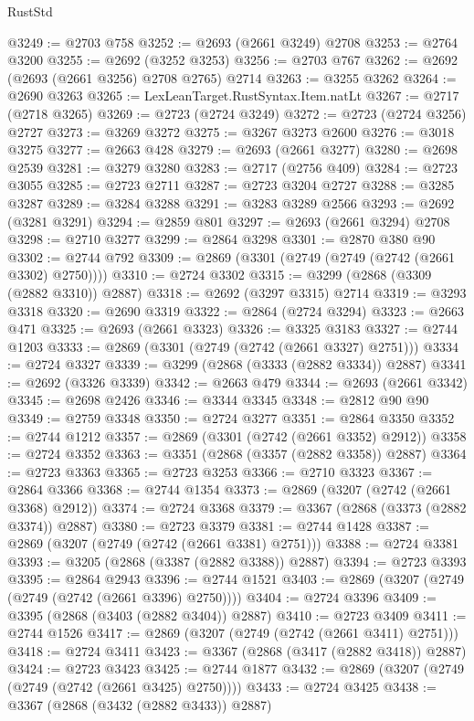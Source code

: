 \begin{lexlean}{RustStd}
\begin{coremodule}
@3249 := @2703 @758
@3252 := @2693 (@2661 @3249) @2708
@3253 := @2764 @3200
@3255 := @2692 (@3252 @3253)
@3256 := @2703 @767
@3262 := @2692 (@2693 (@2661 @3256) @2708 @2765) @2714
@3263 := @3255 @3262
@3264 := @2690 @3263
@3265 := LexLeanTarget.RustSyntax.Item.natLt
@3267 := @2717 (@2718 @3265)
@3269 := @2723 (@2724 @3249)
@3272 := @2723 (@2724 @3256) @2727
@3273 := @3269 @3272
@3275 := @3267 @3273 @2600
@3276 := @3018 @3275
@3277 := @2663 @428
@3279 := @2693 (@2661 @3277)
@3280 := @2698 @2539
@3281 := @3279 @3280
@3283 := @2717 (@2756 @409)
@3284 := @2723 @3055
@3285 := @2723 @2711
@3287 := @2723 @3204 @2727
@3288 := @3285 @3287
@3289 := @3284 @3288
@3291 := @3283 @3289 @2566
@3293 := @2692 (@3281 @3291)
@3294 := @2859 @801
@3297 := @2693 (@2661 @3294) @2708
@3298 := @2710 @3277
@3299 := @2864 @3298
@3301 := @2870 @380 @90
@3302 := @2744 @792
@3309 := @2869 (@3301 (@2749 (@2749 (@2742 (@2661 @3302) @2750))))
@3310 := @2724 @3302
@3315 := @3299 (@2868 (@3309 (@2882 @3310)) @2887)
@3318 := @2692 (@3297 @3315) @2714
@3319 := @3293 @3318
@3320 := @2690 @3319
@3322 := @2864 (@2724 @3294)
@3323 := @2663 @471
@3325 := @2693 (@2661 @3323)
@3326 := @3325 @3183
@3327 := @2744 @1203
@3333 := @2869 (@3301 (@2749 (@2742 (@2661 @3327) @2751)))
@3334 := @2724 @3327
@3339 := @3299 (@2868 (@3333 (@2882 @3334)) @2887)
@3341 := @2692 (@3326 @3339)
@3342 := @2663 @479
@3344 := @2693 (@2661 @3342)
@3345 := @2698 @2426
@3346 := @3344 @3345
@3348 := @2812 @90 @90
@3349 := @2759 @3348
@3350 := @2724 @3277
@3351 := @2864 @3350
@3352 := @2744 @1212
@3357 := @2869 (@3301 (@2742 (@2661 @3352) @2912))
@3358 := @2724 @3352
@3363 := @3351 (@2868 (@3357 (@2882 @3358)) @2887)
@3364 := @2723 @3363
@3365 := @2723 @3253
@3366 := @2710 @3323
@3367 := @2864 @3366
@3368 := @2744 @1354
@3373 := @2869 (@3207 (@2742 (@2661 @3368) @2912))
@3374 := @2724 @3368
@3379 := @3367 (@2868 (@3373 (@2882 @3374)) @2887)
@3380 := @2723 @3379
@3381 := @2744 @1428
@3387 := @2869 (@3207 (@2749 (@2742 (@2661 @3381) @2751)))
@3388 := @2724 @3381
@3393 := @3205 (@2868 (@3387 (@2882 @3388)) @2887)
@3394 := @2723 @3393
@3395 := @2864 @2943
@3396 := @2744 @1521
@3403 := @2869 (@3207 (@2749 (@2749 (@2742 (@2661 @3396) @2750))))
@3404 := @2724 @3396
@3409 := @3395 (@2868 (@3403 (@2882 @3404)) @2887)
@3410 := @2723 @3409
@3411 := @2744 @1526
@3417 := @2869 (@3207 (@2749 (@2742 (@2661 @3411) @2751)))
@3418 := @2724 @3411
@3423 := @3367 (@2868 (@3417 (@2882 @3418)) @2887)
@3424 := @2723 @3423
@3425 := @2744 @1877
@3432 := @2869 (@3207 (@2749 (@2749 (@2742 (@2661 @3425) @2750))))
@3433 := @2724 @3425
@3438 := @3367 (@2868 (@3432 (@2882 @3433)) @2887)

\end{coremodule}
\end{lexlean}
